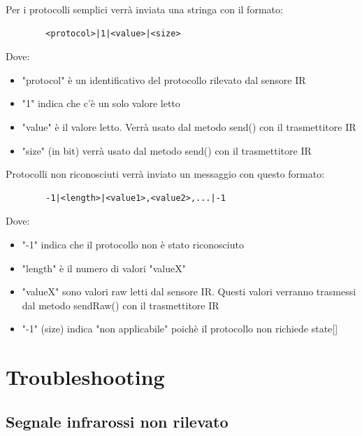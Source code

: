 \documentclass[a4paper,11pt]{article}
\begin{document}
    \begin{samepage}
      Per i protocolli semplici verrà inviata una stringa con il formato:

      \begin{verbatim}
        <protocol>|1|<value>|<size>
      \end{verbatim}

      Dove:
      \begin{itemize}
        \item "protocol" è un identificativo del protocollo rilevato dal sensore IR
        \item "1" indica che c'è un solo valore letto
        \item "value" è il valore letto. Verrà usato dal metodo send() con il trasmettitore IR
        \item "size" (in bit) verrà usato dal metodo send() con il trasmettitore IR
      \end{itemize}
    \end{samepage}

    \bigskip

    \begin{samepage}
      Protocolli non riconosciuti verrà inviato un messaggio con questo formato:

      \begin{verbatim}
        -1|<length>|<value1>,<value2>,...|-1
      \end{verbatim}

      Dove:
      \begin{itemize}
        \item "-1" indica che il protocollo non è stato riconosciuto
        \item "length" è il numero di valori "valueX"
        \item "valueX" sono valori raw letti dal sensore IR. Questi valori verranno trasmessi dal metodo sendRaw() con il trasmettitore IR
        \item "-1" (size) indica "non applicabile" poichè il protocollo non richiede state[]
      \end{itemize}
    \end{samepage}

\section{Troubleshooting}

    \subsection{Segnale infrarossi non rilevato}
\end{document}
